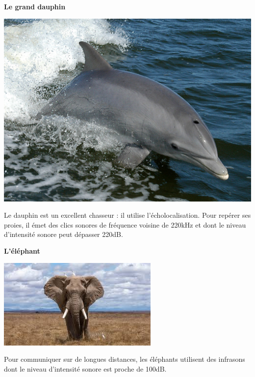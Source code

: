 \documentclass[12pt,a4paper]{article}
\begin{document}
\begin{multicols}{2}
\begin{doc}
\textbf{Le grand dauphin}
\begin{center}
\includegraphics[width=\textwidth]{images/dauphin.jpg}
\end{center}
Le dauphin est un excellent chasseur : il utilise l'écholocalisation.
Pour repérer ses proies, il émet des clics sonores de fréquence voisine de \unit{220}{kHz} et dont le niveau d'intensité sonore peut dépasser \unit{220}{dB}.
\end{doc}

\begin{doc}
\textbf{L'éléphant}
\begin{center}
\includegraphics[width=\textwidth]{images/elephant.jpg}
\end{center}
Pour communiquer sur de longues distances, les éléphants utilisent des infrasons dont le niveau d'intensité sonore est proche de \unit{100}{dB}.
\end{doc}
\end{multicols}
\end{document}
